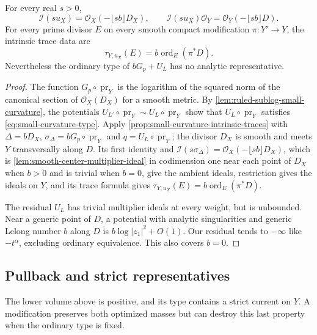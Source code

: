\begin{proposition}\label{prop:ruled-intrinsic-ideal-orders}
For every real $s>0$,
\[
 \mathcal I(su_X)=\mathcal O_X(-\lfloor sb\rfloor D_X),
 \qquad \mathcal I(su_X)\mathcal O_Y
       =\mathcal O_Y(-\lfloor sb\rfloor D).
\]
For every prime divisor $E$ on every smooth compact modification $\pi\colon Y'\to Y$, the intrinsic trace data are
\[
 \tau_{Y,u_X}(E)=b\operatorname{ord}_E(\pi^*D).
\]
Nevertheless the ordinary type of $bG_p+U_L$ has no analytic representative.
\end{proposition}
\begin{proof}
The function $G_p\circ\operatorname{pr}_Y$ is the logarithm of the squared norm of the canonical section of $\mathcal O_X(D_X)$ for a smooth metric. By \cref{lem:ruled-sublog-small-curvature}, the potentials $U_{L'}\circ\operatorname{pr}_Y\sim U_L\circ\operatorname{pr}_Y$ show that $U_L\circ\operatorname{pr}_Y$ satisfies \eqref{eq:small-curvature-type}. Apply \cref{prop:small-curvature-intrinsic-traces} with $\Delta=bD_X$, $\sigma_\Delta=bG_p\circ\operatorname{pr}_Y$ and $q=U_L\circ\operatorname{pr}_Y$; the divisor $D_X$ is smooth and meets $Y$ transversally along $D$. Its first identity and $\mathcal I(s\sigma_\Delta)=\mathcal O_X(-\lfloor sb\rfloor D_X)$, which is \cref{lem:smooth-center-multiplier-ideal} in codimension one near each point of $D_X$ when $b>0$ and is trivial when $b=0$, give the ambient ideals, restriction gives the ideals on $Y$, and its trace formula gives $\tau_{Y,u_X}(E)=b\operatorname{ord}_E(\pi^*D)$.

The residual $U_L$ has trivial multiplier ideals at every weight, but is unbounded. Near a generic point of $D$, a potential with analytic singularities and generic Lelong number $b$ along $D$ is $b\log|z_1|^2+O(1)$. Our residual tends to $-\infty$ like $-t^\alpha$, excluding ordinary equivalence. This also covers $b=0$.
\end{proof}

\subsection{Pullback and strict representatives}

The lower volume above is positive, and its type contains a strict current on $Y$. A modification preserves both optimized masses but can destroy this last property when the ordinary type is fixed.

